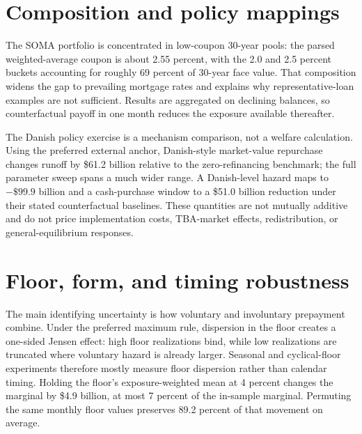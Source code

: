 \documentclass[12pt]{article}
\begin{document}
\section{Composition and policy mappings}\label{app:composition}

The SOMA portfolio is concentrated in low-coupon 30-year pools: the parsed
weighted-average coupon is about 2.55 percent, with the 2.0 and 2.5 percent
buckets accounting for roughly 69 percent of 30-year face value. That composition
widens the gap to prevailing mortgage rates and explains why representative-loan
examples are not sufficient. Results are aggregated on declining balances, so
counterfactual payoff in one month reduces the exposure available thereafter.

The Danish policy exercise is a mechanism comparison, not a welfare calculation.
Using the preferred external anchor, Danish-style market-value repurchase changes
runoff by \$61.2 billion relative to the zero-refinancing benchmark; the full
parameter sweep spans a much wider range. A Danish-level hazard maps to
$-\$99.9$ billion and a cash-purchase window to a \$51.0 billion reduction under their
stated counterfactual baselines. These quantities are not mutually additive and
do not price implementation costs, TBA-market effects, redistribution, or
general-equilibrium responses.

\section{Floor, form, and timing robustness}\label{app:floormech}
\label{sec:robustness-extensions}\label{sec:robustness-wal}
\label{sec:robustness-pipeline}\label{sec:robustness-seasonalfloor}

The main identifying uncertainty is how voluntary and involuntary prepayment
combine. Under the preferred maximum rule, dispersion in the floor creates a
one-sided Jensen effect: high floor realizations bind, while low realizations are
truncated where voluntary hazard is already larger. Seasonal and cyclical-floor
experiments therefore mostly measure floor dispersion rather than calendar
timing. Holding the floor's exposure-weighted mean at 4 percent changes the
marginal by \$4.9 billion, at most 7 percent of the in-sample marginal. Permuting
the same monthly floor values preserves 89.2 percent of that movement on average.
\end{document}
